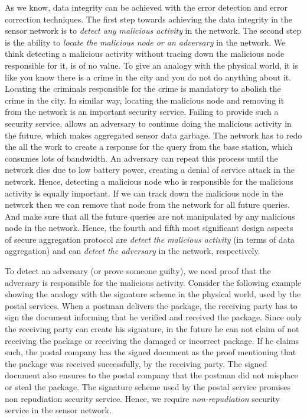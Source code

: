 	As we know, data integrity can be achieved with the error detection and error correction techniques.
	The first step towards achieving the data integrity in the sensor network is to \textit{detect any malicious activity} in the network.
	The second step is the ability to \textit{locate the malicious node or an adversary} in the network.
	We think detecting a malicious activity without tracing down the malicious node responsible for it, is of no value.
	To give an analogy with the physical world, it is like you know there is a crime in the city and you do not do anything about it.
	Locating the criminals responsible for the crime is mandatory to abolish the crime in the city.
	In similar way, locating the malicious node and removing it from the network is an important security service. 
	Failing to provide such a security service, allows an adversary to continue doing the malicious activity in the future, which makes aggregated sensor data garbage. 
	The network has to redo the all the work to create a response for the query from the base station, which consumes lots of bandwidth. 
	An adversary can repeat this process until the network dies due to low battery power, creating a denial of service attack in the network.
	Hence, detecting a malicious node who is responsible for the malicious activity is equally important.
	If we can track down the malicious node in the network then we can remove that node from the network for all future queries.
	And make sure that all the future queries are not manipulated by any malicious node in the network.
	Hence, the fourth and fifth most significant design aspects of secure aggregation protocol are \textit{detect the malicious activity} (in terms of data aggregation) and can \textit{detect the adversary} in the network, respectively.

	To detect an adversary (or prove someone guilty), we need proof that the adversary is responsible for the malicious activity.	 
	Consider the following example showing the analogy with the signature scheme in the physical world, used by the postal services.
	When a postman delivers the package, the receiving party has to sign the document informing that he verified and received the package.
	Since only the receiving party can create his signature, in the future he can not claim of not receiving the package or receiving the damaged or incorrect package. 
	If he claims such, the postal company has the signed document as the proof mentioning that the package was received successfully, by the receiving party.
	The signed document also ensures to the postal company that the postman did not misplace or steal the package.
	The signature scheme used by the postal service promises non repudiation security service.
	Hence, we require \textit{non-repudiation} security service in the sensor network.

